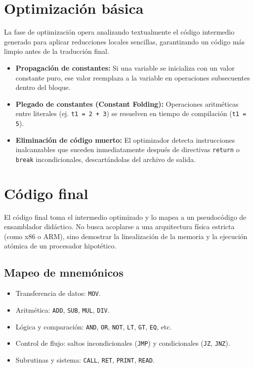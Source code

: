 \documentclass[12pt]{article}
\begin{document}
\section{Optimización básica}
La fase de optimización opera analizando textualmente el código intermedio generado para aplicar reducciones locales sencillas, garantizando un código más limpio antes de la traducción final.

\begin{itemize}[label={-}]
    \item \textbf{Propagación de constantes:} Si una variable se inicializa con un valor constante puro, ese valor reemplaza a la variable en operaciones subsecuentes dentro del bloque.
    \item \textbf{Plegado de constantes (Constant Folding):} Operaciones aritméticas entre literales (ej. \texttt{t1 = 2 + 3}) se resuelven en tiempo de compilación (\texttt{t1 = 5}).
    \item \textbf{Eliminación de código muerto:} El optimizador detecta instrucciones inalcanzables que suceden inmediatamente después de directivas \texttt{return} o \texttt{break} incondicionales, descartándolas del archivo de salida.
\end{itemize}

\section{Código final}
El código final toma el intermedio optimizado y lo mapea a un pseudocódigo de ensamblador didáctico. No busca acoplarse a una arquitectura física estricta (como x86 o ARM), sino demostrar la linealización de la memoria y la ejecución atómica de un procesador hipotético.

\subsection{Mapeo de mnemónicos}
\begin{itemize}[label={-}]
    \item Transferencia de datos: \texttt{MOV}.
    \item Aritmética: \texttt{ADD}, \texttt{SUB}, \texttt{MUL}, \texttt{DIV}.
    \item Lógica y comparación: \texttt{AND}, \texttt{OR}, \texttt{NOT}, \texttt{LT}, \texttt{GT}, \texttt{EQ}, etc.
    \item Control de flujo: saltos incondicionales (\texttt{JMP}) y condicionales (\texttt{JZ}, \texttt{JNZ}).
    \item Subrutinas y sistema: \texttt{CALL}, \texttt{RET}, \texttt{PRINT}, \texttt{READ}.
\end{itemize}
\end{document}
